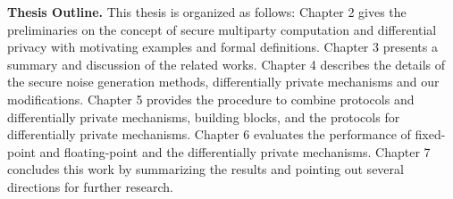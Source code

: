 \textbf{Thesis Outline.}
This thesis is organized as follows:
Chapter 2 gives the preliminaries on the concept of secure multiparty computation and differential privacy with motivating examples and formal definitions.
Chapter 3 presents a summary and discussion of the related works.
Chapter 4 describes the details of the secure noise generation methods, differentially private mechanisms and our modifications.
Chapter 5 provides the procedure to combine \smpc protocols and differentially private mechanisms, building blocks, and the \smpc protocols for differentially private mechanisms.
Chapter 6 evaluates the performance of fixed-point and floating-point and the differentially private mechanisms.
Chapter 7 concludes this work by summarizing the results and pointing out several directions for further research.


